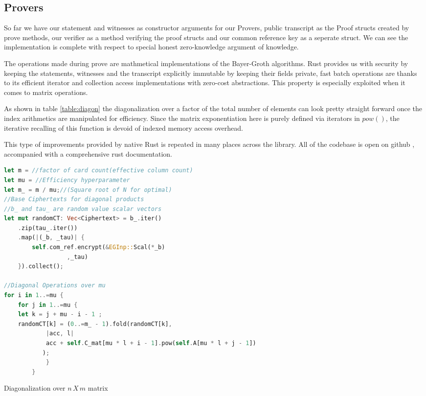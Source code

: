\documentclass[12pt,a4paper]{report}
\begin{document}
\subsection*{Provers}
So far we have our statement and witnesses as constructor arguments for our Provers, public transcript as the Proof structs created by prove methods, our verifier as a method verifying the proof structs and our common reference key as a seperate struct. We can see the implementation is complete with respect to special honest zero-knowledge argument of knowledge.\par
The operations made during prove are  mathmetical implementations of the Bayer-Groth algorithms. 
Rust provides us with security by keeping the statements, witnesses and the transcript explicitly immutable by keeping their fields private, 
fast batch operations are thanks to its efficient iterator and collection access implementations with zero-cost abstractions.
This property is especially exploited when it comes to matrix operations.\par
As shown in table \ref{table:diagon} the diagonalization over a factor of the total number of elements
can look pretty straight forward once the index arithmetics are manipulated for efficiency.
Since the matrix exponentiation here is purely defined via iterators in $pow()$, 
the iterative recalling of this function is devoid of indexed memory access overhead.\par
This type of improvements provided by native Rust is repeated in many places across the library.
All of the codebase is open on github \cite{repo}, accompanied with a comprehensive rust documentation.

\begin{table}
\begin{lstlisting}[language=Rust]
let m = //factor of card count(effective column count)
let mu = //Efficiency hyperparameter
let m_ = m / mu;//(Square root of N for optimal)
//Base Ciphertexts for diagonal products
//b_ and tau_ are random value scalar vectors
let mut randomCT: Vec<Ciphertext> = b_.iter()
	.zip(tau_.iter())
	.map(|(_b, _tau)| {
	    self.com_ref.encrypt(&EGInp::Scal(*_b) 
				  ,_tau)
	}).collect();

//Diagonal Operations over mu
for i in 1..=mu {
    for j in 1..=mu {
	let k = j + mu - i - 1 ;
	randomCT[k] = (0..=m_ - 1).fold(randomCT[k],
		    |acc, l|
			acc + self.C_mat[mu * l + i - 1].pow(self.A[mu * l + j - 1])
		   );
            }
        }
\end{lstlisting}
\caption{Diagonalization over $n\,X\,m$ matrix}
\label{table:diagon}
\end{table}
\end{document}

